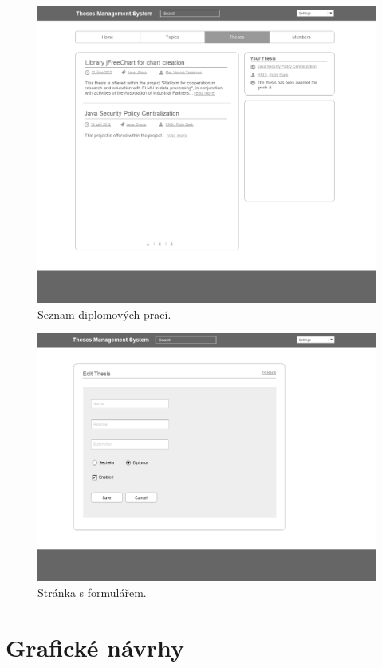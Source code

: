 \begin{figure}[htbp]
    \centering
    \includegraphics[width=\textwidth]{images/w4.png}
    \caption{Seznam diplomových prací.}
    \label{img:layout1}
\end{figure}

\begin{figure}[htbp]
    \centering
    \includegraphics[width=\textwidth]{images/w5.png}
    \caption{Stránka s formulářem.}
    \label{img:layout1}
\end{figure}

\chapter{Grafické návrhy}

